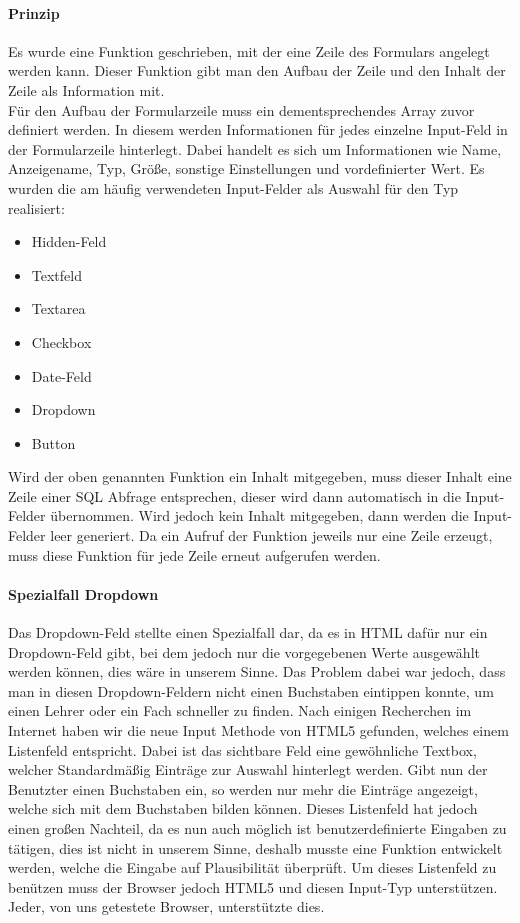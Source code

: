 \paragraph{Prinzip}
Es wurde eine Funktion geschrieben, mit der eine Zeile des Formulars angelegt werden kann. Dieser Funktion gibt man den Aufbau der Zeile und den Inhalt der Zeile als Information mit.\\
Für den Aufbau der Formularzeile muss ein dementsprechendes Array zuvor definiert werden. In diesem werden Informationen für jedes einzelne Input-Feld in der Formularzeile hinterlegt. Dabei handelt es sich um Informationen wie Name, Anzeigename, Typ, Größe, sonstige Einstellungen und vordefinierter Wert. Es wurden die am häufig verwendeten  Input-Felder als Auswahl für den Typ realisiert:
\begin{itemize}
	\item Hidden-Feld
	\item Textfeld
	\item Textarea
	\item Checkbox
	\item Date-Feld
	\item Dropdown
	\item Button
\end{itemize}
Wird der oben genannten Funktion ein Inhalt mitgegeben, muss dieser Inhalt eine Zeile einer SQL Abfrage entsprechen, dieser wird dann automatisch in die Input-Felder übernommen. Wird jedoch kein Inhalt mitgegeben, dann werden die Input-Felder leer generiert. Da ein Aufruf der Funktion jeweils nur eine Zeile erzeugt, muss diese Funktion für jede Zeile erneut aufgerufen werden.
\paragraph{Spezialfall Dropdown}
Das Dropdown-Feld stellte einen Spezialfall dar, da es in HTML dafür nur ein Dropdown-Feld gibt, bei dem jedoch nur die vorgegebenen Werte ausgewählt werden können, dies wäre in unserem Sinne. Das Problem dabei war jedoch, dass man in diesen Dropdown-Feldern nicht einen Buchstaben eintippen konnte, um einen Lehrer oder ein Fach schneller zu finden. Nach einigen Recherchen im Internet haben wir die neue Input Methode von HTML5 gefunden, welches einem Listenfeld entspricht. Dabei ist das sichtbare Feld eine gewöhnliche Textbox, welcher Standardmäßig Einträge zur Auswahl hinterlegt werden. Gibt nun der Benutzter einen Buchstaben ein, so werden nur mehr die Einträge angezeigt, welche sich mit dem Buchstaben bilden können. Dieses Listenfeld hat jedoch einen großen Nachteil, da es nun auch möglich ist benutzerdefinierte Eingaben zu tätigen, dies ist nicht in unserem Sinne, deshalb musste eine Funktion entwickelt werden, welche die Eingabe auf Plausibilität überprüft. Um dieses Listenfeld zu benützen muss der Browser jedoch HTML5 und diesen Input-Typ unterstützen. Jeder, von uns getestete Browser, unterstützte dies.
